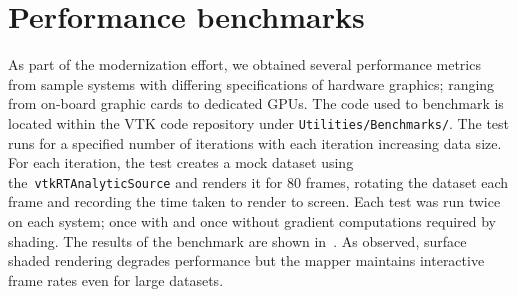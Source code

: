 \section{Performance benchmarks}
\label{performance-benchmarks}
As part of the modernization effort, we obtained several performance metrics
from sample systems with differing specifications of hardware graphics; ranging
from on-board graphic cards to dedicated GPUs. The code used to benchmark is
located within the VTK code repository under \texttt{Utilities/Benchmarks/}. The
test runs for a specified number of iterations with each iteration increasing
data size. For each iteration, the test creates a mock dataset using
the~\texttt{vtkRTAnalyticSource} and renders it for 80 frames, rotating the
dataset each frame and recording the time taken to render to screen.  Each test
was run twice on each system; once with and once without gradient computations
required by shading. The results of the benchmark are shown
in~. As observed, surface shaded rendering degrades
performance but the mapper maintains interactive frame rates even for large
datasets.

